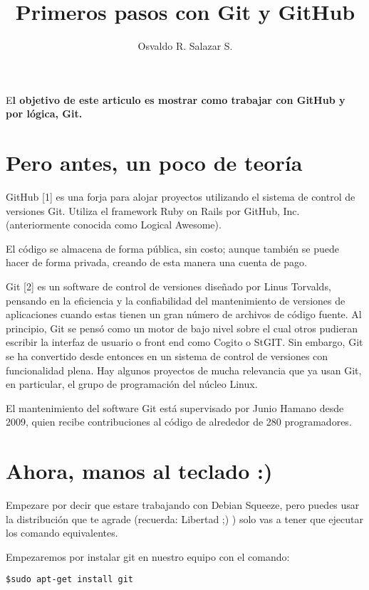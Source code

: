 \documentclass[	DIV=calc,%
							paper=letterpaper,%
							fontsize=13pt,%
							twocolumn]
{article}	 					%
\title{Primeros pasos con Git y GitHub}				%
\author{Osvaldo R. Salazar S.}			%
\date{}							%
\newcommand{\initial}[1]{%
     \lettrine[lines=3,lhang=0.3,nindent=0em]{
     				\color{DarkGoldenrod}
     				{\textsf{#1}}}{}}
\begin{document}
\maketitle
\thispagestyle{fancy} 			%
\initial{E}\textbf{l objetivo de este articulo es mostrar como trabajar con GitHub y por lógica, Git.}

\section*{Pero antes, un poco de teoría}
GitHub [1] es una forja para alojar proyectos utilizando el sistema de control de versiones Git. Utiliza el framework Ruby on Rails por GitHub, Inc. (anteriormente conocida como Logical Awesome).

El código se almacena de forma pública, sin costo; aunque también se puede hacer de forma privada, creando de esta manera una cuenta de pago.

Git [2] es un software de control de versiones diseñado por Linus Torvalds, pensando en la eficiencia y la confiabilidad del mantenimiento de versiones de aplicaciones cuando estas tienen un gran número de archivos de código fuente. Al principio, Git se pensó como un motor de bajo nivel sobre el cual otros pudieran escribir la interfaz de usuario o front end como Cogito o StGIT. Sin embargo, Git se ha convertido desde entonces en un sistema de control de versiones con funcionalidad plena. Hay algunos proyectos de mucha relevancia que ya usan Git, en particular, el grupo de programación del núcleo Linux.

El mantenimiento del software Git está supervisado por Junio Hamano desde 2009, quien recibe contribuciones al código de alrededor de 280 programadores. 

\section*{Ahora, manos al teclado :)}
Empezare por decir que estare trabajando con Debian Squeeze, pero puedes usar la distribución que te agrade (recuerda: Libertad ;) ) solo vas a tener que ejecutar los comando equivalentes.

Empezaremos por instalar git en nuestro equipo con el comando:

\begin{verbatim}
$sudo apt-get install git
\end{verbatim}
\end{document}
